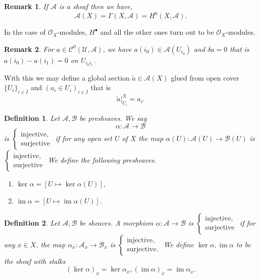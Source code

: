\documentclass{article}
\newtheorem{definition}{Definition}[section]
\newtheorem{remark}{Remark}[section]
\DeclareMathOperator{\image}{im}
\newcommand{\cA}[0]{\mathcal{A}}
\newcommand{\cB}[0]{\mathcal{B}}
\newcommand{\cC}[0]{\mathcal{C}}
\newcommand{\sU}[0]{\mathscr{U}}
\newcommand{\Ouv}[0]{\mathcal{O}}
\begin{document}
\begin{remark}
  \par If $\mathcal{A}$ is a sheaf then we have,
\begin{equation*}
  \mathcal{A}(X)=\Gamma(X,\mathcal{A}) = H^0(X,\mathcal{A}).
\end{equation*}
\end{remark}
 
In the case of $\Ouv_X$-modules, $H^\bullet$ and all the other ones turn out to be $\Ouv_X$-modules.

\begin{remark}
  For $a\in\cC^0(\sU,\cA)$, we have $a(i_0)\in\cA(U_{i_0})$ and $\delta a=0$ that is $a(i_0)-a(i_1) = 0$ on $U_{i_0i_1}$.
\end{remark}
With this we may define a global section $\tilde{a}\in\cA(X)$ glued from open cover $\{U_i\}_{i\in I}$ and $(a_i\in U_i)_{i\in I}$ that is 
\begin{equation*}
  \tilde{a}|_{U_i}^{X} = a_i.
\end{equation*}
\begin{definition}
  Let $\cA,\cB$ be presheaves. We say 
  \begin{equation*}
    \alpha:\cA\to\cB
  \end{equation*}
  is 
  $\begin{cases}
    \text{injective},\\
    \text{surjective}
  \end{cases}$
  if for any open set $U$ of $X$ the map $\alpha(U):\cA(U)\to\cB(U)$ is 
  $\begin{cases}
    \text{injective},\\
    \text{surjective}
  \end{cases}$
  We define the following presheaves.
  \begin{enumerate}[1).]
    \item $\ker\alpha = [U\mapsto \ker\alpha(U)]$,
    \item $\image\alpha = [U\mapsto \image \alpha(U)]$.
  \end{enumerate}
\end{definition}

\begin{definition}
  Let $\cA,\cB$ be sheaves. A morphism $\alpha:\cA\to\cB$ is 
  $\begin{cases}
    \text{injective},\\
    \text{surjective}
  \end{cases}$ if for any $x\in X$, the map $\alpha_x:\cA_x\to\cB_x$ is 
  $\begin{cases}
    \text{injective},\\
    \text{surjective}.
  \end{cases}$
  We define $\ker\alpha,\image\alpha$ to be the sheaf with stalks
  \begin{equation*}
    (\ker\alpha)_x = \ker\alpha_x, (\image\alpha)_x = \image\alpha_x.
  \end{equation*}
\end{definition}
\end{document}
